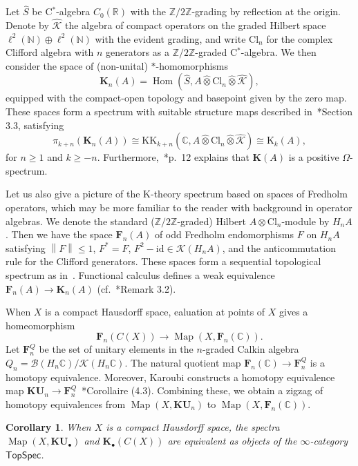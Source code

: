 \documentclass[a4paper,reqno]{amsart}
\theoremstyle{plain}
\newtheorem{corollary}[theorem]{Corollary}
\theoremstyle{definition}
\theoremstyle{remark}
\numberwithin{equation}{section}
\newcommand{\rK}{\mathrm{K}}
\newcommand{\cB}{\mathcal{B}}
\newcommand{\cK}{\mathcal{K}}
\newcommand{\dC}{\mathbb{C}}
\newcommand{\dN}{\mathbb{N}}
\newcommand{\dR}{\mathbb{R}}
\newcommand{\dZ}{\mathbb{Z}}
\newcommand{\bF}{\mathbf{F}}
\newcommand{\bK}{\mathbf{K}}
\newcommand{\TopSpec}{\mathsf{TopSpec}}
\newcommand{\id}{\mathrm{id}}
\newcommand{\KK}{\mathrm{KK}}
\newcommand{\norm}[1]{\left\| #1\right\|}
\newcommand{\hatotimes}{\mathbin{\hat{\otimes}}}
\newcommand{\KU}{\mathbf{KU}}
\newcommand{\Cl}{\mathrm{Cl}}
\DeclareMathOperator{\Map}{Map}
\DeclareMathOperator{\Hom}{Hom}
\begin{document}
Let $\hat{S}$ be C$^*$-algebra $C_0(\dR)$ with the $\dZ/2\dZ$-grading by reflection at the origin.
Denote by $\hat{\cK}$ the algebra of compact operators on the graded Hilbert space $\ell^2(\dN) \oplus \ell^2(\dN)$ with the evident grading, and write $\Cl_n$ for the  complex Clifford algebra with $n$ generators as a $\dZ/2\dZ$-graded C$^*$-algebra.
We then consider the space of (non-unital) $*$-homomorphisms
\begin{equation*}%
\bK_n(A) = \Hom(\hat{S}, A \hatotimes \Cl_n \hatotimes \hat{\cK}),
\end{equation*}
equipped with the compact-open topology and basepoint given by the zero map.
These spaces form a spectrum with suitable structure maps described in~\cite{dekm:spec}*{Section 3.3}, satisfying
\begin{equation*}%
  \pi_{k+n}(\bK_n(A))\cong \KK_{k+n}(\dC,A\hatotimes \Cl_n \hatotimes \hat{\cK}) \cong 
\rK_{k}(A),
\end{equation*}
for $n\geq 1$ and $k\geq -n$.
Furthermore,~\cite{dekm:spec}*{p.~12} explains that $\bK(A)$ is a positive $\Omega$-spectrum.

\medskip

Let us also give a picture of the $\rK$-theory spectrum based on spaces of Fredholm operators, which may be more familiar to the reader with background in operator algebras. We denote the standard ($\dZ/2\dZ$-graded) Hilbert $A \otimes \Cl_n$-module by $H_n A$.
Then we have the space $\bF_n(A)$ of odd Fredholm endomorphisms $F$ on $H_n A$ satisfying $\norm{F} \le 1$, $F^* = F$, $F^2 - \id \in \cK(H_n A)$, and the anticommutation rule for the Clifford generators.
These spaces form a sequential topological spectrum as in~\cite{bjs:spec}.
Functional calculus defines a weak equivalence $\bF_n(A) \to \bK_n(A)$ (cf.~\cite{dekm:spec}*{Remark 3.2}).

When $X$ is a compact Hausdorff space, ealuation at points of $X$ gives a homeomorphism
\[
\bF_n(C(X)) \to \Map(X, \bF_n(\dC)).
\]
Let $\bF^Q_n$ be the set of unitary elements in the $n$-graded Calkin algebra $Q_n = \cB(H_n \dC) / \cK(H_n \dC)$.
The natural quotient map $\bF_n(\dC) \to \bF^Q_n$ is a homotopy equivalence.
Moreover, Karoubi constructs a homotopy equivalence map $\KU_n \to \bF^Q_n$~\cite{MR261592}*{Corollaire (4.3)}. Combining these, we obtain a zigzag of homotopy equivalences from $\Map(X, \KU_n)$ to $\Map(X, \bF_n(\dC))$.

\begin{corollary}%
When $X$ is a compact Hausdorff space, the spectra $\Map(X, \KU_\bullet)$ and $\bK_\bullet(C(X))$ are equivalent as objects of the $\infty$-category $\TopSpec$.
\end{corollary}
\end{document}
